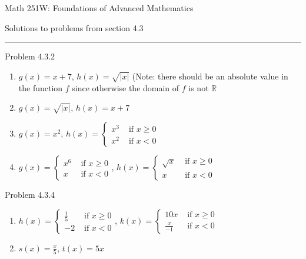 \documentclass{article}
\theoremstyle{definition}
\newcommand{\R}{\mathbb{R}}
\begin{document}
	\begin{center}
		\Large{Math 251W: Foundations of Advanced Mathematics}

		\normalsize Solutions to problems from section 4.3
		\hrule
		\vspace{0.4cm}

	\end{center}


	\noindent Problem 4.3.2  \vspace{0.3cm}

	\begin{enumerate}
		\item $g(x)=x+7$, $h(x)=\sqrt{|x|}$   (Note: there should be an
		absolute value in the function $f$ since otherwise the domain of $f$
		is not $\R$
		\item $g(x)=\sqrt{|x|}$, $h(x)=x+7$
		\item $g(x)=x^2$, $h(x)=\left\{\begin{array}{cc}
										   x^3 & \mbox{ if
										   }x\ge 0\\ x^2 & \mbox{ if } x<0
		\end{array}\right.$
		\item $g(x)=\left\{\begin{array}{cc}
							   x^6 & \mbox{ if } x\ge0\\ x &
							   \mbox{ if } x<0
		\end{array}\right.$, $h(x)=\left\{\begin{array}{cc}
											  \sqrt{x}
											  & \mbox{ if } x\ge0\\ x & \mbox{ if } x<0
		\end{array}\right.$
	\end{enumerate}

	\vspace{1cm}


	\noindent Problem 4.3.4  \vspace{0.3cm}

	\begin{enumerate}
		\item $h(x)=\left\{\begin{array}{cc}
							   \frac{1}{5}
							   & \mbox{ if } x\ge0\\ -2 & \mbox{ if } x<0
		\end{array}\right.$,
		$k(x)=\left\{\begin{array}{cc}
						 10x & \mbox{ if } x\ge0\\
						 \frac{x}{-1} & \mbox{ if } x<0
		\end{array}\right.$
		\item $s(x)=\frac{x}{5}$, $t(x)=5x$
	\end{enumerate}
\end{document}
